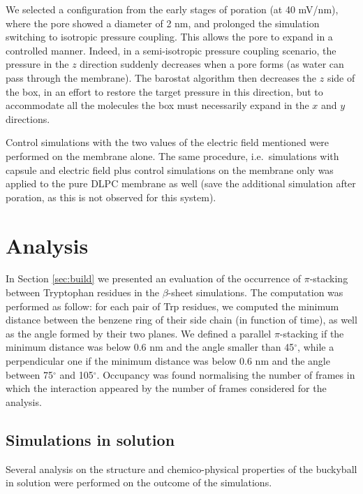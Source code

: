 We selected a configuration from the early stages of poration (at 40 mV/nm), where the pore showed a diameter of 2 nm, and prolonged the simulation switching to isotropic pressure coupling. This allows the pore to expand in a controlled manner. Indeed, in a semi-isotropic pressure coupling scenario, the pressure in the $z$ direction suddenly decreases when a pore forms (as water can pass through the membrane). The barostat algorithm then decreases the $z$ side of the box, in an effort to restore the target pressure in this direction, but to accommodate all the molecules the box must necessarily expand in the $x$ and $y$ directions.

Control simulations with the two values of the electric field mentioned were performed on the membrane alone. The same procedure, i.e.\ simulations with capsule and electric field plus control simulations on the membrane only was applied to the pure DLPC membrane as well (save the additional simulation after poration, as this is not observed for this system).


\section{Analysis} \label{sec:analysis}

In Section \ref{sec:build} we presented an evaluation of the occurrence of $\pi$-stacking between Tryptophan residues in the $\beta$-sheet simulations. The computation was performed as follow: for each pair of Trp residues, we computed the minimum distance between the benzene ring of their side chain (in function of time), as well as the angle formed by their two planes. We defined a parallel $\pi$-stacking if the minimum distance was below 0.6 nm and the angle smaller than 45$^{\circ}$, while a perpendicular one if the minimum distance was below 0.6 nm and the angle between 75$^{\circ}$ and 105$^{\circ}$. Occupancy was found normalising the number of frames in which the interaction appeared by the number of frames considered for the analysis.    
    
\subsection{Simulations in solution}
Several analysis on the structure and chemico-physical properties of the buckyball in solution were performed on the outcome of the simulations.

